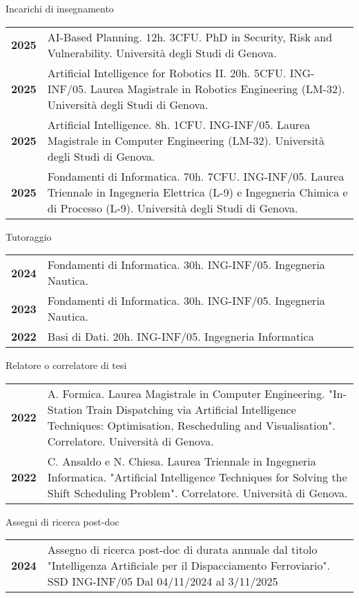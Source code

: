 \documentclass{resume} %
\begin{document}
\begin{rSection}{Incarichi  di insegnamento}
	\begin{tabularx}{0.95\textwidth} {lp{14cm}}
 \textbf{2025} & AI-Based Planning. 12h. 3CFU. PhD in Security, Risk and Vulnerability. Università degli Studi di Genova.  \\
 \textbf{2025} & Artificial Intelligence for Robotics II. 20h. 5CFU. ING-INF/05. Laurea Magistrale in Robotics Engineering (LM-32). Università degli Studi di Genova.  \\
  \textbf{2025} & Artificial Intelligence. 8h. 1CFU. ING-INF/05. Laurea Magistrale in Computer Engineering (LM-32). Università degli Studi di Genova.  \\
  \textbf{2025} & Fondamenti di Informatica. 70h. 7CFU. ING-INF/05. Laurea Triennale in Ingegneria Elettrica (L-9) e Ingegneria Chimica e di Processo (L-9). Università degli Studi di Genova.  \\
\end{tabularx}
\end{rSection}
\begin{rSection}{Tutoraggio}
	\begin{tabularx}{0.95\textwidth} {lp{14cm}}
 \textbf{2024} & Fondamenti di Informatica. 30h. ING-INF/05. Ingegneria Nautica.  \\
 \textbf{2023} & Fondamenti di Informatica. 30h. ING-INF/05. Ingegneria Nautica.  \\
 \textbf{2022} & Basi di Dati. 20h. ING-INF/05. Ingegneria Informatica \end{tabularx}
\end{rSection}
\pagebreak
\begin{rSection}{Relatore o correlatore di tesi}
	\begin{tabularx}{0.95\textwidth} {lp{14cm}}
 \textbf{2022} & A. Formica. Laurea Magistrale in Computer Engineering. "In-Station Train Dispatching via Artificial Intelligence Techniques: Optimisation, Rescheduling and Visualisation". Correlatore. Università di Genova.  \\
 \textbf{2022} & C. Ansaldo e N. Chiesa. Laurea Triennale in Ingegneria Informatica. "Artificial Intelligence Techniques for Solving the Shift Scheduling Problem". Correlatore. Università di Genova.
 \end{tabularx}
\end{rSection}

\begin{rSection}{Assegni di ricerca post-doc}
	\begin{tabularx}{0.95\textwidth} {lp{14cm}}
 \textbf{2024} & Assegno di ricerca post-doc di durata annuale dal titolo "Intelligenza Artificiale per il Dispacciamento Ferroviario". SSD ING-INF/05 Dal 04/11/2024 al 3/11/2025
 \end{tabularx}
\end{rSection}
\end{document}
